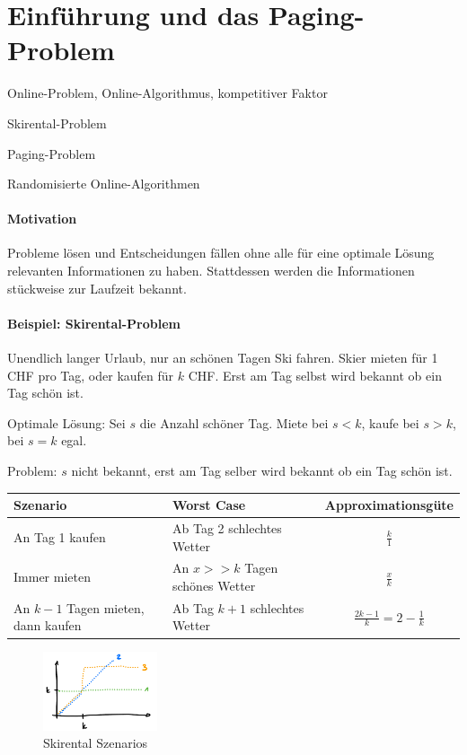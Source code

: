 \section{Einführung und das Paging-Problem}

\begin{takeaway}
    \item Online-Problem, Online-Algorithmus, kompetitiver Faktor
    \item Skirental-Problem
    \item Paging-Problem
    \item Randomisierte Online-Algorithmen
\end{takeaway}

\paragraph{Motivation}
Probleme lösen und Entscheidungen fällen ohne alle für eine optimale Lösung relevanten Informationen zu haben.
Stattdessen werden die Informationen stückweise zur Laufzeit bekannt.

\paragraph{Beispiel: Skirental-Problem}
Unendlich langer Urlaub, nur an schönen Tagen Ski fahren.
Skier mieten für 1 CHF pro Tag, oder kaufen für $k$ CHF.
Erst am Tag selbst wird bekannt ob ein Tag schön ist.

Optimale Lösung: Sei $s$ die Anzahl schöner Tag.
Miete bei $s < k$, kaufe bei $s > k$, bei $s=k$ egal.

Problem: $s$ nicht bekannt, erst am Tag selber wird bekannt ob ein Tag schön ist.

\begin{table}[h]
    \begin{tabular}{l|l|c}
        Szenario & Worst Case & Approximationsgüte \\ \hline
        An Tag 1 kaufen & Ab Tag 2 schlechtes Wetter & $\frac{k}{1}$ \\
        Immer mieten & An $x >> k$ Tagen schönes Wetter & $\frac{x}{k}$ \\
        An $k-1$ Tagen mieten, dann kaufen & Ab Tag $k+1$ schlechtes Wetter & $\frac{2k-1}{k} = 2-\frac{1}{k}$
    \end{tabular}
\end{table}
\begin{figure}[h]
    \centering
    \includegraphics[width=0.3\textwidth]{images/skirental.png}
    \caption{Skirental Szenarios}
\end{figure}

